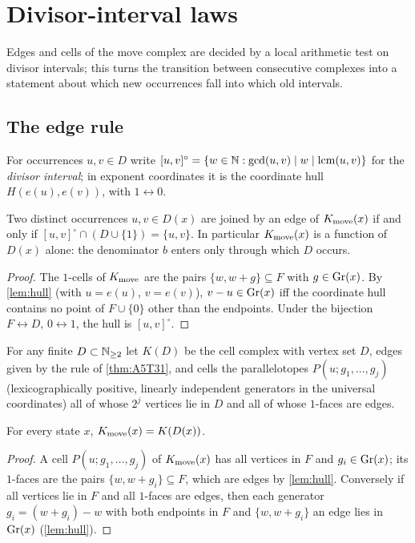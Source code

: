 \section{Divisor-interval laws}\label{sec:interval}
Edges and cells of the move complex are decided by a local arithmetic test on divisor intervals; this turns the transition between consecutive complexes into a statement about which new occurrences fall into which old intervals.

\subsection{The edge rule}
For occurrences $u,v\in D$ write $[u,v]^\circ=\{w\in\mathbb N:\gcd(u,v)\mid w\mid\operatorname{lcm}(u,v)\}$ for the \emph{divisor interval}; in exponent coordinates it is the coordinate hull $H(e(u),e(v))$, with $1\leftrightarrow0$.
\begin{theorem}\label{thm:A5T31}
Two distinct occurrences $u,v\in D(x)$ are joined by an edge of $K_{\mathrm{move}}(x)$ if and only if $[u,v]^\circ\cap(D\cup\{1\})=\{u,v\}$. In particular $K_{\mathrm{move}}(x)$ is a function of $D(x)$ alone: the denominator $b$ enters only through which $D$ occurs.
\end{theorem}
\begin{proof}
The $1$-cells of $K_{\mathrm{move}}$ are the pairs $\{w,w+g\}\subseteq F$ with $g\in\mathrm{Gr}(x)$. By \cref{lem:hull} (with $u=e(u)$, $v=e(v)$), $v-u\in\mathrm{Gr}(x)$ iff the coordinate hull contains no point of $F\cup\{0\}$ other than the endpoints. Under the bijection $F\leftrightarrow D$, $0\leftrightarrow1$, the hull is $[u,v]^\circ$. \qedhere
\end{proof}
\begin{definition}\label{def:KD}
For any finite $D\subset\mathbb N_{\ge2}$ let $K(D)$ be the cell complex with vertex set $D$, edges given by the rule of \cref{thm:A5T31}, and cells the parallelotopes $P(u;g_1,\dots,g_j)$ (lexicographically positive, linearly independent generators in the universal coordinates) all of whose $2^j$ vertices lie in $D$ and all of whose $1$-faces are edges.
\end{definition}
\begin{proposition}\label{prop:intrinsic}
For every state $x$, $K_{\mathrm{move}}(x)=K(D(x))$.
\end{proposition}
\begin{proof}
A cell $P(u;g_1,\dots,g_j)$ of $K_{\mathrm{move}}(x)$ has all vertices in $F$ and $g_i\in\mathrm{Gr}(x)$; its $1$-faces are the pairs $\{w,w+g_i\}\subseteq F$, which are edges by \cref{lem:hull}. Conversely if all vertices lie in $F$ and all $1$-faces are edges, then each generator $g_i=(w+g_i)-w$ with both endpoints in $F$ and $\{w,w+g_i\}$ an edge lies in $\mathrm{Gr}(x)$ (\cref{lem:hull}). \qedhere
\end{proof}
